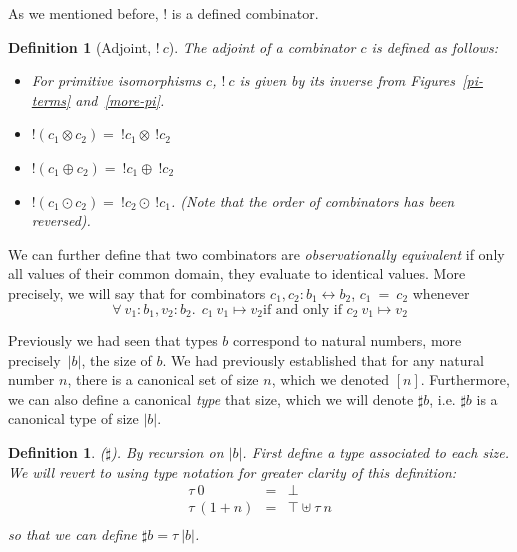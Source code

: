 \documentclass{article}
\newtheorem{definition}[theorem]{Definition}
\begin{document}
As we mentioned before, $!$ is a defined combinator.

\begin{definition}[Adjoint, \ensuremath{!~ c}]
 The adjoint of a combinator \ensuremath{c} is defined as follows:

  \begin{itemize}
  \item For primitive isomorphisms \ensuremath{c}, \ensuremath{!~ c} is given by its
    inverse from Figures~\ref{pi-terms} and~\ref{more-pi}.

  \item \ensuremath{!(c_1 \otimes c_2) =\ !c_1 \otimes~ !c_2}

  \item \ensuremath{!(c_1 \oplus c_2) =\ !c_1 \oplus~ !c_2}

  \item \ensuremath{!(c_1\odot c_2) =\ !c_2 \odot~ !c_1}. (Note that the
    order of combinators has been reversed).

  \end{itemize}
\end{definition}

\noindent We can further define that two combinators are 
\emph{observationally equivalent} if only all values of their
common domain, they evaluate to identical values.  More precisely,
we will say that for combinators $c_1, c_2 : b_1 \leftrightarrow b_2$,
$c_1~=~c_2$ whenever
\[
  \forall  ~v_1:b_1, v_2 : b_2. ~~ c_1 ~v_1 \mapsto v_2 \text{if and only if\ } c_2 ~v_1 \mapsto v_2
\]

Previously we had seen that types $b$ correspond to natural numbers,
more precisely~$|b|$, the size of $b$.  We had previously established that 
for any natural number $n$, there is a canonical set of size $n$,
which we denoted $[n]$. Furthermore, we can also define a
canonical \emph{type} that size, which we will denote $\sharp b$,
i.e. $\sharp b$ is a canonical type of size $|b|$.

\begin{definition}($\sharp$). By recursion on $|b|$.  First define a
type associated to each size. We will revert to using type notation
for greater clarity of this definition:
\[\begin{array}{rcl}
  \tau~ 0 & = & \bot \\
  \tau~ (1 + n) & = & \top \uplus \tau~ n \\
 \end{array}\]
\noindent so that we can define $\sharp b = \tau~ |b|$.
\end{definition}
\end{document}
